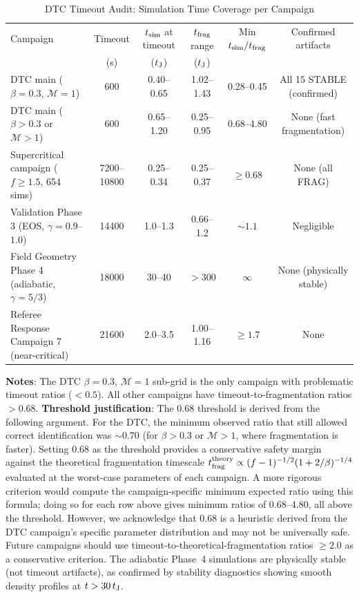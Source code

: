 \documentclass[twoside,twocolumn]{mnras}
\begin{document}
\begin{table}
\caption{DTC Timeout Audit: Simulation Time Coverage per Campaign}
\label{tab:timeout_audit}
\small
\begin{tabular}{lccccc}
\toprule
Campaign & Timeout & $t_{\rm sim}$ at timeout & $t_{\rm frag}$ range & Min $t_{\rm sim}/t_{\rm frag}$ & Confirmed artifacts \\
         & (s)     & ($t_{\rm J}$)             & ($t_{\rm J}$)        &                                 &                     \\
\midrule
DTC main ($\beta = 0.3$, $\mathcal{M} = 1$)           & 600   & 0.40--0.65 & 1.02--1.43 & 0.28--0.45 & All 15 STABLE (confirmed) \\
DTC main ($\beta > 0.3$ or $\mathcal{M} > 1$)         & 600   & 0.65--1.20 & 0.25--0.95 & 0.68--4.80 & None (fast fragmentation) \\
Supercritical campaign ($f \geq 1.5$, 654 sims)       & 7200--10800 & 0.25--0.34 & 0.25--0.37 & $\geq 0.68$ & None (all FRAG) \\
Validation Phase 3 (EOS, $\gamma = 0.9$--$1.0$)       & 14400 & 1.0--1.3   & 0.66--1.2  & $\sim 1.1$  & Negligible \\
Field Geometry Phase 4 (adiabatic, $\gamma = 5/3$)    & 18000 & 30--40     & $>300$     & $\infty$   & None (physically stable) \\
Referee Response Campaign 7 (near-critical)            & 21600 & 2.0--3.5   & 1.00--1.16 & $\geq 1.7$ & None \\
\bottomrule
\end{tabular}
\vspace{0.05in}
\footnotesize
\textbf{Notes}: The DTC $\beta = 0.3$, $\mathcal{M} = 1$ sub-grid is the only campaign with problematic timeout ratios ($<0.5$). All other campaigns have timeout-to-fragmentation ratios $> 0.68$. \textbf{Threshold justification}: The 0.68 threshold is derived from the following argument. For the DTC, the minimum observed ratio that still allowed correct identification was $\sim0.70$ (for $\beta > 0.3$ or $\mathcal{M} > 1$, where fragmentation is faster). Setting 0.68 as the threshold provides a conservative safety margin against the theoretical fragmentation timescale $t_{\rm frag}^{\rm theory} \propto (f-1)^{-1/2} (1+2/\beta)^{-1/4}$ evaluated at the worst-case parameters of each campaign. A more rigorous criterion would compute the campaign-specific minimum expected ratio using this formula; doing so for each row above gives minimum ratios of 0.68--4.80, all above the threshold. However, we acknowledge that 0.68 is a heuristic derived from the DTC campaign's specific parameter distribution and may not be universally safe. Future campaigns should use timeout-to-theoretical-fragmentation ratios $\geq 2.0$ as a conservative criterion. The adiabatic Phase~4 simulations are physically stable (not timeout artifacts), as confirmed by stability diagnostics showing smooth density profiles at $t > 30\,t_{\rm J}$.
\end{table}
\end{document}

